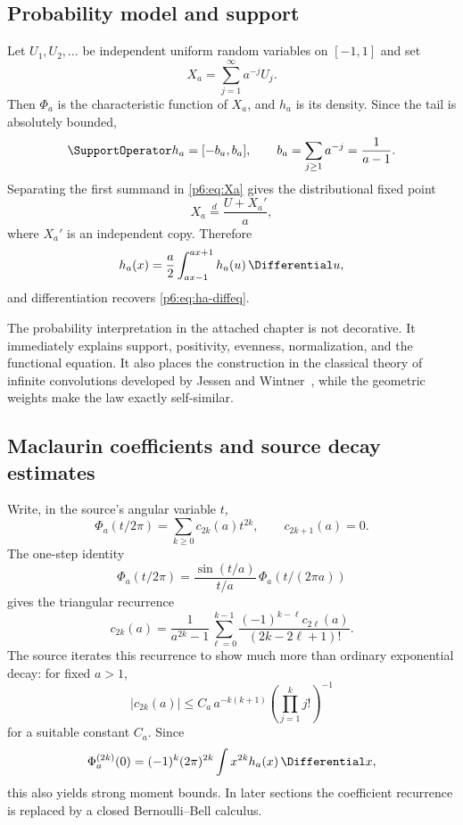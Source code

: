 \documentclass[11pt,oneside]{article}
\numberwithin{equation}{section}
\theoremstyle{definition}
\theoremstyle{remark}
\begin{document}
\subsection{Probability model and support}

Let $U_1,U_2,\dots$ be independent uniform random variables on $[-1,1]$ and
set
\begin{equation}\label{p6:eq:Xa}
 X_a=\sum_{j=1}^{\infty}a^{-j}U_j.
\end{equation}
Then $\Phi_a$ is the characteristic function of $X_a$, and $h_a$ is its
density.  Since the tail is absolutely bounded,
\begin{equation}\label{p6:eq:ha-support}
 \SupportOperator h_a=[-b_a,b_a],\qquad b_a=\sum_{j\ge1}a^{-j}=\frac1{a-1}.
\end{equation}
Separating the first summand in \eqref{p6:eq:Xa} gives the distributional fixed
point
\[
 X_a\overset d=\frac{U+X_a'}a,
\]
where $X_a'$ is an independent copy.  Therefore
\begin{equation}\label{p6:eq:ha-integral-refinement}
 h_a(x)=\frac a2\int_{ax-1}^{ax+1}h_a(u)\,\Differential u,
\end{equation}
and differentiation recovers \eqref{p6:eq:ha-diffeq}.

\begin{sourcebox}
The probability interpretation in the attached chapter is not decorative.  It
immediately explains support, positivity, evenness, normalization, and the
functional equation.  It also places the construction in the classical theory
of infinite convolutions developed by Jessen and Wintner~\cite{p6:jessen-wintner}, while the geometric
weights make the law exactly self-similar.
\end{sourcebox}

\subsection{Maclaurin coefficients and source decay estimates}

Write, in the source's angular variable $t$,
\[
 \Phi_a(t/2\pi)=\sum_{k\ge0}c_{2k}(a)t^{2k},
 \qquad c_{2k+1}(a)=0.
\]
The one-step identity
\[
 \Phi_a(t/2\pi)=\frac{\sin(t/a)}{t/a}\,
 \Phi_a(t/(2\pi a))
\]
gives the triangular recurrence
\begin{equation}\label{p6:eq:source-c-recurrence}
 c_{2k}(a)=\frac1{a^{2k}-1}
 \sum_{\ell=0}^{k-1}
 \frac{(-1)^{k-\ell}c_{2\ell}(a)}{(2k-2\ell+1)!}.
\end{equation}
The source iterates this recurrence to show much more than ordinary exponential
decay: for fixed $a>1$,
\begin{equation}\label{p6:eq:c-coeff-superdecay}
 |c_{2k}(a)|\le C_a\,
 a^{-k(k+1)}\left(\prod_{j=1}^{k}j!\right)^{-1}
\end{equation}
for a suitable constant $C_a$.  Since
\[
 \Phi_a^{(2k)}(0)=(-1)^k(2\pi)^{2k}\int x^{2k}h_a(x)\,\Differential x,
\]
this also yields strong moment bounds.  In later sections the coefficient
recurrence is replaced by a closed Bernoulli--Bell calculus.
\end{document}
